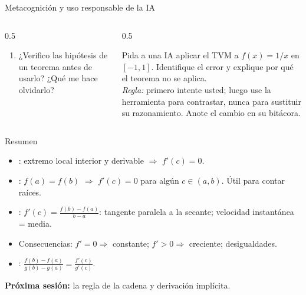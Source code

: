 \documentclass[10pt,aspectratio=169]{beamer}
\begin{document}
\begin{frame}{Metacognición y uso responsable de la IA}
  \small
  \begin{columns}[t]
    \begin{column}{0.5\textwidth}
      \begin{metacog}
        \begin{enumerate}
          \metacomun
          \item ¿Verifico las hipótesis de un teorema antes de usarlo? ¿Qué me hace olvidarlo?
        \end{enumerate}
      \end{metacog}
    \end{column}
    \begin{column}{0.5\textwidth}
      \begin{iabox}
        Pida a una IA aplicar el TVM a $f(x)=1/x$ en $[-1,1]$. Identifique el error y explique por qué el teorema no se aplica.\\[2pt]
        \textit{Regla:} primero intente usted; luego use la herramienta para contrastar, nunca para sustituir su razonamiento. Anote el cambio en su bitácora.
      \end{iabox}
    \end{column}
  \end{columns}
\end{frame}

\begin{frame}{Resumen}
  \begin{itemize}
    \item {}: extremo local interior y derivable $\Rightarrow$ $f'(c)=0$.
    \item {}: $f(a)=f(b)$ $\Rightarrow$ $f'(c)=0$ para algún $c\in(a,b)$. Útil para contar raíces.
    \item {}: $f'(c)=\frac{f(b)-f(a)}{b-a}$: tangente paralela a la secante; velocidad instantánea = media.
    \item Consecuencias: $f'=0\Rightarrow$ constante; $f'>0\Rightarrow$ creciente; desigualdades.
    \item {}: $\frac{f(b)-f(a)}{g(b)-g(a)}=\frac{f'(c)}{g'(c)}$.
  \end{itemize}
  \vspace{3mm}
  \textbf{Próxima sesión:} la regla de la cadena y derivación implícita.
\end{frame}
\end{document}
